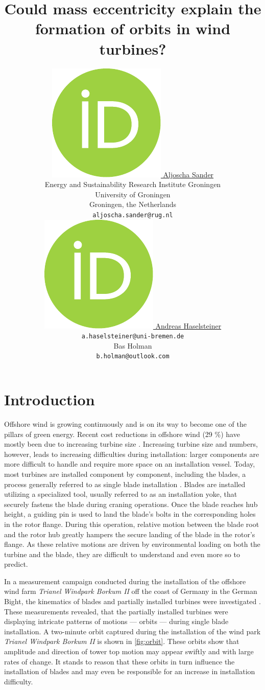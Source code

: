 \documentclass{article}
\title{Could mass eccentricity explain the formation of orbits in wind turbines?}
\author{ \href{https://orcid.org/0000-0001-8717-9688}{\includegraphics[scale=0.06]{orcid.pdf}\hspace{1mm} Aljoscha Sander} \\
	Energy and Sustainability Research Institute Groningen\\
	University of Groningen\\
	Groningen, the Netherlands \\
	\texttt{aljoscha.sander@rug.nl} \\
	\And
	\href{https://orcid.org/0000-0000-0000-0000}{\includegraphics[scale=0.06]{orcid.pdf}\hspace{1mm} Andreas Haselsteiner} \\
	\texttt{a.haselsteiner@uni-bremen.de} \\
	\And
	Bas Holman \\
	\texttt{b.holman@outlook.com}\\
}
\begin{document}
\maketitle

\begin{abstract}
\end{abstract}




\section{Introduction}
\label{sec:introduction}

Offshore wind is growing continuously and is on its way to become one of the pillars of green energy. Recent cost reductions in offshore wind (29 \%) have mostly been due to increasing turbine size \citep{irenaRenewablePowerGeneration2020}. Increasing turbine size and numbers, however, leads to increasing difficulties during installation: larger components are more difficult to handle and require more space on an installation vessel. Today, most turbines are installed component by component, including the blades, a process generally referred to as single blade installation \citep{jiangInstallationOffshoreWind2021}. Blades are installed utilizing a specialized tool, usually referred to as an installation yoke, that securely fastens the blade during craning operations. Once the blade reaches hub height, a guiding pin is used to land the blade's bolts in the corresponding holes in the rotor flange. During this operation, relative motion between the blade root and the rotor hub greatly hampers the secure landing of the blade in the rotor's flange. As these relative motions are driven by environmental loading on both the turbine and the blade, they are difficult to understand and even more so to predict. 

In a measurement campaign conducted during the installation of the offshore wind farm \textit{Trianel Windpark Borkum II} off the coast of Germany in the German Bight, the kinematics of blades and partially installed turbines were investigated \citep{sanderRelativeMotionSingle2020,  sanderMONITORINGOFFSHOREWIND2020, sanderOscillationsOffshoreWind2020}. These measurements revealed, that the partially installed turbines were displaying intricate patterns of motions — orbits — during single blade installation. A two-minute orbit captured during the installation of the wind park \textit{Trianel Windpark Borkum II} is shown in \autoref{fig:orbit}. These orbits show that amplitude and direction of tower top motion may appear swiftly and with large rates of change. It stands to reason that these orbits in turn influence the installation of blades and may even be responsible for an increase in installation difficulty.
\end{document}
